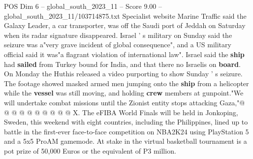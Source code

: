 \begin{textsample}{POS Dim 6 – global\_south\_2023\_11 – Score 9.00 – global\_south\_2023\_11/103714875.txt}
Specialist website Marine Traffic said the Galaxy Leader, a car transporter, was off the Saudi port of Jeddah on Saturday when its radar signature disappeared.
Israel ' s military on Sunday said the seizure was a"very grave incident of global consequence", and a US military official said it was"a flagrant violation of international law".
Israel said the \textbf{ship} had \textbf{sailed} from Turkey bound for India, and that there no Israelis on \textbf{board}.
On Monday the Huthis released a video purporting to show Sunday ' s seizure.
The footage showed masked armed men jumping onto the \textbf{ship} from a helicopter while the \textbf{vessel} was still moving, and holding \textbf{crew} members at gunpoint."We will undertake combat missions until the Zionist entity stops attacking Gaza,"@ @ @ @ @ @ @ @ @ @ X.
The eFIBA World Finals will be held in Jonkoping, Sweden, this weekend with eight countries, including the Philippines, lined up to battle in the first-ever face-to-face competition on NBA2K24 using PlayStation 5 and a 5x5 ProAM gamemode.
At stake in the virtual basketball tournament is a pot prize of 50,000 Euros or the equivalent of P3 million.

\end{textsample}
